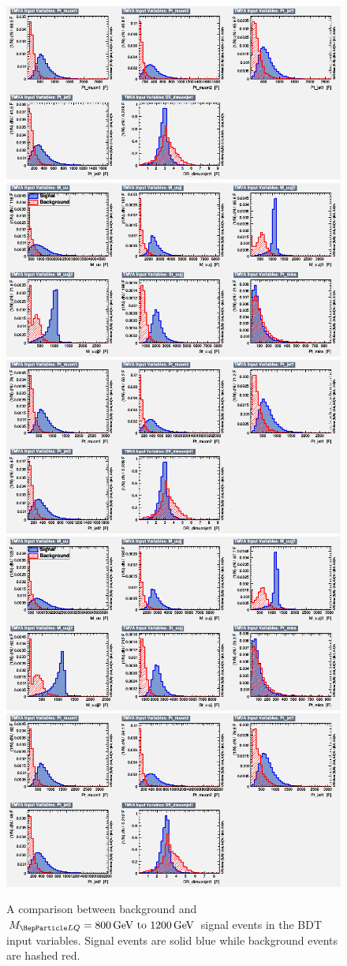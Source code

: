 \begin{figure}[H]
    {\includegraphics[width=.49\textwidth]{Images/Analysis/Results_LQToBMu_pair_uubj_BDTG_FullRun2_2023_01_25_020318/1000/variables_id_c2.png}}
    {\includegraphics[width=.49\textwidth]{Images/Analysis/Results_LQToBMu_pair_uubj_BDTG_FullRun2_2023_01_25_020318/1100/variables_id_c1.png}}
    {\includegraphics[width=.49\textwidth]{Images/Analysis/Results_LQToBMu_pair_uubj_BDTG_FullRun2_2023_01_25_020318/1100/variables_id_c2.png}}
    {\includegraphics[width=.49\textwidth]{Images/Analysis/Results_LQToBMu_pair_uubj_BDTG_FullRun2_2023_01_25_020318/1200/variables_id_c1.png}}
    {\includegraphics[width=.49\textwidth]{Images/Analysis/Results_LQToBMu_pair_uubj_BDTG_FullRun2_2023_01_25_020318/1200/variables_id_c2.png}}
    \caption{A comparison between background and $\MLQ = \SIrange{800}{1200}{GeV}$ signal events in the BDT input variables. Signal events are solid blue while background events are hashed red.}
    \label{figapp:variables2}
\end{figure}


